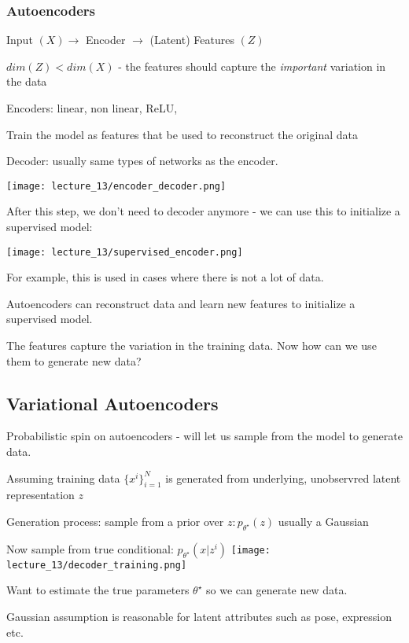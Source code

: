 \subsubsection{Autoencoders}

Input $(X) \rightarrow$ Encoder $\rightarrow$ (Latent) Features $(Z)$

$ dim(Z) < dim(X)$ - the features should capture the \emph{important} variation in the data

Encoders: linear, non linear, ReLU, 

Train the model as features that be used to reconstruct the original data

Decoder: usually same types of networks as the encoder.

\texttt{[image: lecture\_13/encoder\_decoder.png]}

After this step, we don't need to decoder anymore - we can use this to initialize a supervised model:

\texttt{[image: lecture\_13/supervised\_encoder.png]}

For example, this is used in cases where there is not a lot of data.

Autoencoders can reconstruct data and learn new features to initialize a supervised model. 

The features capture the variation in the training data. Now how can we use them to generate new data?

\subsection{Variational Autoencoders}

Probabilistic spin on autoencoders - will let us sample from the model to generate data.

Assuming training data $\{x^{i}\}_{i=1}^N $ is generated  from underlying, unobservred latent representation $z$ 

Generation process: sample from a prior over $z : p_{\theta^\star}(z)$  usually a Gaussian 

Now sample from true conditional: $p_{\theta^\star}(x|z^i)$ \texttt{[image: lecture\_13/decoder\_training.png]}

Want to estimate the true parameters $\theta^\star$ so we can generate new data.

Gaussian assumption is reasonable for latent attributes such as pose, expression etc.

